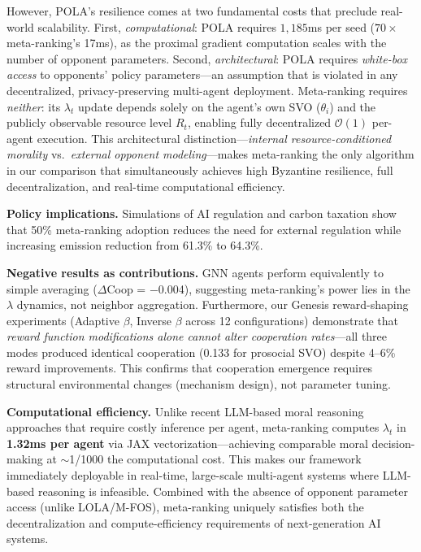 \documentclass{article}
\begin{document}
However, POLA's resilience comes at two fundamental costs that preclude real-world scalability. First, \textit{computational}: POLA requires $1{,}185$ms per seed ($70{\times}$ meta-ranking's 17ms), as the proximal gradient computation scales with the number of opponent parameters. Second, \textit{architectural}: POLA requires \textit{white-box access} to opponents' policy parameters---an assumption that is violated in any decentralized, privacy-preserving multi-agent deployment. Meta-ranking requires \textit{neither}: its $\lambda_t$ update depends solely on the agent's own SVO ($\theta_i$) and the publicly observable resource level $R_t$, enabling fully decentralized $\mathcal{O}(1)$ per-agent execution. This architectural distinction---\textit{internal resource-conditioned morality} vs.\ \textit{external opponent modeling}---makes meta-ranking the only algorithm in our comparison that simultaneously achieves high Byzantine resilience, full decentralization, and real-time computational efficiency.

\textbf{Policy implications.} Simulations of AI regulation and carbon taxation show that 50\% meta-ranking adoption reduces the need for external regulation while increasing emission reduction from 61.3\% to 64.3\%.

\textbf{Negative results as contributions.} GNN agents perform equivalently to simple averaging ($\Delta$Coop = $-$0.004), suggesting meta-ranking's power lies in the $\lambda$ dynamics, not neighbor aggregation. Furthermore, our Genesis reward-shaping experiments (Adaptive $\beta$, Inverse $\beta$ across 12 configurations) demonstrate that \textit{reward function modifications alone cannot alter cooperation rates}---all three modes produced identical cooperation (0.133 for prosocial SVO) despite 4--6\% reward improvements. This confirms that cooperation emergence requires structural environmental changes (mechanism design), not parameter tuning.

\textbf{Computational efficiency.} Unlike recent LLM-based moral reasoning approaches that require costly inference per agent, meta-ranking computes $\lambda_t$ in \textbf{1.32ms per agent} via JAX vectorization---achieving comparable moral decision-making at $\sim$1/1000 the computational cost. This makes our framework immediately deployable in real-time, large-scale multi-agent systems where LLM-based reasoning is infeasible. Combined with the absence of opponent parameter access (unlike LOLA/M-FOS), meta-ranking uniquely satisfies both the decentralization and compute-efficiency requirements of next-generation AI systems.
\end{document}
